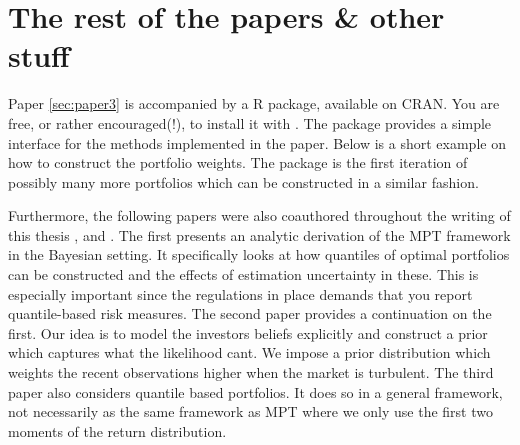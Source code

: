 \documentclass[]{book}\usepackage{knitr}
\begin{document}
\section{The rest of the papers \& other stuff}

Paper \ref{sec:paper3} is accompanied by a R package, available on CRAN. 
You are free, or rather encouraged(!), to install it with \hlstd{(}\hlstd{)}. 
The package provides a simple interface for the methods implemented in the paper. 
Below is a short example on how to construct the portfolio weights. 
The package is the first iteration of possibly many more portfolios which can be constructed in a similar fashion. 

\begin{knitrout}
\color{fgcolor}
\end{knitrout}

Furthermore, the following papers were also coauthored throughout the writing of this thesis \cite{bodnar2020quantile}, \cite{bodnar2021bayesian}  and \cite{bodnar2021quantile}.
The first presents an analytic derivation of the MPT framework in the Bayesian setting. 
It specifically looks at how quantiles of optimal portfolios can be constructed and the effects of estimation uncertainty in these. 
This is especially important since the regulations in place demands that you report quantile-based risk measures. 
The second paper provides a continuation on the first. 
Our idea is to model the investors beliefs explicitly and construct a prior which captures what the likelihood cant. 
We impose a prior distribution which weights the recent observations higher when the market is turbulent. 
The third paper also considers quantile based portfolios. 
It does so in a general framework, not necessarily as the same framework as MPT where we only use the first two moments of the return distribution.
\end{document}
